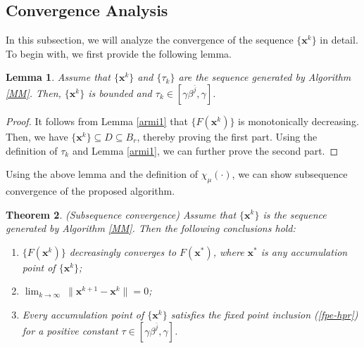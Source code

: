 \documentclass{article}
\newtheorem{theorem}{Theorem}[section]
\newtheorem{lemma}[theorem]{Lemma}
\numberwithin{equation}{section}
\begin{document}
\subsection{Convergence Analysis}

In this subsection, we will analyze the convergence of the sequence $\{\mathbf{x}^k\}$ in detail.  To begin with, we first provide the following lemma.


\begin{lemma}\label{xktaukbound}
Assume that $\{\mathbf{x}^{k}\}$ and $\{\tau_k\}$ are the sequence generated by Algorithm \ref{MM}. Then,
$\{\mathbf{x}^k\}$ is bounded and $\tau_k\in[\gamma\beta^{\bar{j}},\gamma]$.
\end{lemma}

\begin{proof}
It follows from Lemma \ref{armi1} that $\{F(\mathbf{x}^{k})\}$ is monotonically decreasing.
Then, we have $\{\mathbf{x}^k\}\subseteq D\subseteq B_r$, thereby proving the first part.
Using the definition of $\tau_k$ and Lemma \ref{armi1}, we can further prove the second part. \end{proof}

Using the above lemma and the definition of $\chi_{\mu}(\cdot)$, we can show subsequence convergence of the proposed algorithm.


\begin{theorem}\label{conv-sub}(Subsequence convergence)
Assume that $\{\mathbf{x}^k\}$ is the sequence generated by Algorithm \ref{MM}. Then the following conclusions hold:
\begin{enumerate}
	\item $\{F(\mathbf{x}^{k})\}$  decreasingly converges to $F(\mathbf{x}^*)$, where $\mathbf{x}^*$ is any accumulation point of $\{\mathbf{x}^{k}\}$;
	\item $\lim_{k\rightarrow\infty}~\|\mathbf{x}^{k+1}-\mathbf{x}^k\|=0$;
	\item Every accumulation point of $\{\mathbf{x}^{k}\}$ satisfies the fixed point inclusion
(\ref{fpe-hpr})
for a positive constant $\tau\in[\gamma\beta^{\bar{j}},\gamma]$.
\end{enumerate}
\end{theorem}
\end{document}
